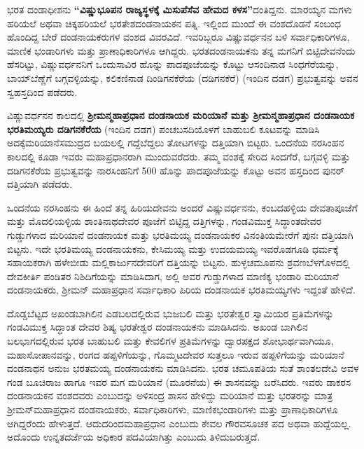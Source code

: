 ಭರತ ದಂಡಾಧೀಶನು \textbf{“ವಿಷ್ಣುಭೂಪನ ರಾಜ್ಯಸ್ಥಳಕ್ಕೆ ಮಿಸುಪೆಸೆವ ಹೇಮದ ಕಳಸ”}ದಂತಿದ್ದನು. ಮಾರಯ್ಯನ ಮಗಳು ಹರಿಯಲೆ ಅಥವಾ ಚಿಕ್ಕಹರಿಯಲೆ ಭರತೇಶದಂಡನಾಯಕನ ಪತ್ನಿ. ಇಲ್ಲಿಂದ ಮುಂದೆ ಈ ವಂಶದೊಡನೆ ಸಂಬಂಧ ಹೊಂದಿದ್ದ ಬೇರೆ ದಂಡನಾಯಕರುಗಳ ವಂಶದ ವಿವರವಿದೆ. ಇವರಿಬ್ಬರೂ ವಿಷ್ಣುವರ್ಧನನ ಬಳಿ ಸರ್ವಾಧಿಕಾರಿಗಳೂ, ಮಾಣಿಕ ಭಂಡಾರಿಗಳು ಮತ್ತು ಪ್ರಾಣಾಧಿಕಾರಿಗಳೂ ಆಗಿದ್ದರು. ಭರತದಂಡನಾಯಕನು ತನ್ನ ಮಗನಿಗೆ ಬಿಟ್ಟಿದೇವನೆಂದು ಹೆಸರಿಟ್ಟು, ವಿಷ್ಣುವರ್ಧನನಿಗೆ ಒಂದುಸಾವಿರ ಹೊನ್ನು ಪಾದಪೂಜೆಯನ್ನು ಕೊಟ್ಟು ಆಸಂದಿನಾಡ ಸಿಂಧಗೆರೆಯನ್ನು, ಬಾಯ್​ಬೆಣ್ಣೆಗೆ ಬಗ್ಗವಳ್ಳಿಯನ್ನು, ಕಲಿಕಣಿನಾಡ ದಿಂಡಿಗನಕೆರೆಯ (ದಡಿಗನಕೆರೆ) (ಇಂದಿನ ದಡಗ) ಪ್ರಭುತ್ವವನ್ನು ಅವನ ಸ್ವಹಸ್ತದಿಂದ ಪಡೆದರು.

ವಿಷ್ಣುವರ್ಧನನ ಕಾಲದಲ್ಲಿ \textbf{ಶ‍್ರೀಮನ್ಮಹಾಪ್ರಧಾನ ದಂಡನಾಯಕ ಮರಿಯಾನೆ ಮತ್ತು ಶ‍್ರೀಮನ್ಮಹಾಪ್ರಧಾನ ದಂಡನಾಯಕ ಭರತಿಮಯ್ಯರು ದಡಿಗನಕೆರೆಯ} (ಇಂದಿನ ದಡಗ) ಪಂಚಬಸದಿಯೊಳಗೆ ಬಾಹುಬಲಿ ಕೂಟವನ್ನು ಮಾಡಿಸಿ ಅದಕ್ಕೆ\break ಮರಿಯಾನೆಸಮುದ್ರದ ಬಯಲಲ್ಲಿ ಗದ್ದೆಬೆದ್ದಲು ತೋಟಗಳನ್ನು ದತ್ತಿಯಾಗಿ ಬಿಟ್ಟರು. ಒಂದನೆಯ ನರಸಿಂಹನ ಕಾಲದಲ್ಲಿ ಕೂಡಾ ಇವರು ಮಹಾಪ್ರಧಾನರಾಗಿ ಮುಂದುವರೆದರು. ತಮ್ಮ ವಂಶಕ್ಕೆ ಸೇರಿದ ಸಿಂದಗೆರೆ, ಬಗ್ಗವಳ್ಳಿ ಮತ್ತು ದಡಿಗನಕೆರೆಯ ಪ್ರಭುತ್ವವನ್ನು ನಾರಸಿಂಹನಿಗೆ 500 ಹೊನ್ನು ಪಾದಪೂಜೆಯನ್ನು ಕೊಟ್ಟು ಅವನ ಹಸ್ತದಿಂದ ಪುನರ್​ದತ್ತಿಯಾಗಿ ಪಡೆದರು.

ಒಂದನೆಯ ನರಸಿಂಹನು ಈ ಹಿಂದೆ ತನ್ನ ಹಿರಿಯದೇವನು ಅಂದರೆ ವಿಷ್ಣುವರ್ಧನನು, ಕಂಬದಹಳ್ಳಿಯ ದೇವತಾ\-ಪೂಜೆಗೆ ಮತ್ತು ಮೊದಲಿಯಳ್ಳಿಯ ಶಾಂತಿನಾಥದೇವರ ಪೂಜೆಗೆ ಬಿಟ್ಟಿದ್ದ ದತ್ತಿಗಳನ್ನು, ಗಂಡವಿಮುಕ್ತ ಸಿದ್ಧಾಂತದೇವರ ಗುಡ್ಡುಗಳಾದ ಮರಿಯಾನೆ ದಂಡನಾಯಕ ಮತ್ತು ಭರತಿಮಯ್ಯ ದಂಡನಾಯಕರ ವಿನಂತಿಯಮೇರೆಗೆ ಪುನಃ ದತ್ತಿಯಾಗಿ ಬಿಟ್ಟನು. ಇದೇ ಭರತಿಮಯ್ಯ ದಂಡನಾಯಕನು, ಕೇಸಿಮಯ್ಯ ಮತ್ತು ಉದಯಮಯ್ಯ ಇವರೊಡಗೂಡಿ ಧರ್ಮಕ್ಕೆ ಸಹಾಯಕರಾಗಿ ಹಳೇಬೀಡು ಮಲ್ಲಿಕಾರ್ಜುನದೇವರಿಗೆ ದತ್ತಿಯನ್ನು ಬಿಟ್ಟನು. ಹುಳ್ಳಚಮೂಪನು ಶ್ರವಣಬೆಳಗೊಳದಲ್ಲಿ ದೇವಕೀರ್ತಿ ಪಂಡಿತರ ನಿಶಿದಿಗೆಯನ್ನು ಮಾಡಿಸಿದಾಗ, ಅಲ್ಲಿ ಅವರ ಗುಡ್ಡುಗಳಾದ ಮಾಣಿಕ್ಯ ಭಂಡಾರಿ ಮರಿಯಾನೆ ದಂಡನಾಯ\-ಕರು, ಶ‍್ರೀಮನ್​ ಮಹಾಪ್ರಧಾನ ಸರ್ವಾಧಿಕಾರಿ ಪಿರಿಯ ದಂಡನಾಯಕ ಭರತಿಮಯ್ಯಗಳು ಇದ್ದಂತೆ ಹೇಳಿದೆ.

ದೊಡ್ಡಬೆಟ್ಟದ ಅಖಂಡಬಾಗಿಲಿನ ಎಡಬಲದಲ್ಲಿರುವ ಭುಜಬಲಿ ಮತ್ತು ಭರತೇಶ್ವರ ಸ್ವಾಮಿಯರ ಪ್ರತಿಮೆಗಳನ್ನು ಗಂಡವಿಮುಕ್ತ ಸಿದ್ಧಾಂತ ದೇವರ ಶಿಷ್ಯ ಭರತೇಶ್ವರ ದಂಡನಾಯಕನು ಮಾಡಿಸಿದನು. ಅಖಂಡ ಬಾಗಿಲಿನ ಬಲಭಾಗದಲ್ಲಿರುವ ಭರತ ಬಾಹುಬಲಿ ಮತ್ತು ಕೇವಲಿಗಳ ಪ್ರತಿಮೆಗಳನ್ನು ದ್ವಾರಪಕ್ಷದ ಶೋಭಾರ್ಥವಾಗಿಯೂ, ಮಹಾಸೋಪಾನವನ್ನು, ರಂಗದ ಹಪ್ಪಳಿಗೆಯನ್ನು, ಗೊಮ್ಮಟದೇವರ ಸುತ್ತಲೂ ಇರುವ ಹಪ್ಪಳಿಗೆಯನ್ನು ಮರಿಯಾನೆ ದಂಡನಾಥನ ಅನುಜ ಭರತಮಯ್ಯ ದಂಡನಾಯಕನು ಮಾಡಿಸಿದನು. ಭರತ ಚಮೂಪತಿಯ ಸುತೆ ಶಾಂತಲದೇವಿ ಅವಳ ಗಂಡ ಬೂಚಿರಾಜ ಹಾಗೂ ಇವರ ಮಗ ಮರಿಯಾನೆ (ಮೂರನೆಯ) ಈ ಶಾಸನವನ್ನು ಬರೆಸಿದರು. ಇವರು ಡಾಕರಸ ದಂಡನಾಯಕನ ವಂಶದವರು ಎಂಬುದನ್ನು ಅಳಿಸಂದ್ರ ಶಾಸನ ಹೇಳಿದ್ದು ಮರಿಯಾನೆ ಮತ್ತು ಭರತರನ್ನು ಮಾತ್ರ ಶ‍್ರೀಮನ್​ ಮಹಾಪ್ರಧಾನ ದಂಡನಾಯಕರು, ಸರ್ವಾಧಿಕಾರಿಗಳು, ಮಾಣಿಕಭಂಡಾರಿಗಳು ಮತ್ತು ಪ್ರಾಣಾಧಿಕಾರಿಗಳೂ ಆಗಿದ್ದರೆಂದು ಹೇಳುತ್ತದೆ. ಆದುದರಿಂದ\break ಮಹಾಪ್ರಧಾನ ಎಂಬುದು ಕೇವಲ ಗೌರವಸೂಚಕ ಪದ ಅಥವಾ ಹುದ್ದೆಯಲ್ಲ. ಅದೊಂದು ಉನ್ನತದರ್ಜೆಯ ಅಧಿಕಾರ ಪದವಿಯಾಗಿತ್ತು ಎಂಬುದು ತಿಳಿದುಬರುತ್ತದೆ.

